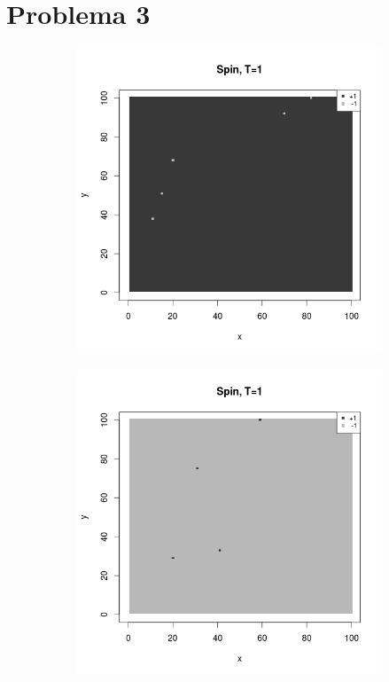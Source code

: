 \documentclass{scrartcl}
\begin{document}
\clearpage
\section{Problema 3}
\begin{figure}[ht]
\centering
\begin{subfigure}{.35\textwidth}
  \centering
  \includegraphics[width=1\linewidth]{spins/spinT1+}
\end{subfigure}%
\begin{subfigure}{.35\textwidth}
  \centering
  \includegraphics[width=1\linewidth]{spins/spinT1-}

\end{subfigure}
\end{figure}
\end{document}
